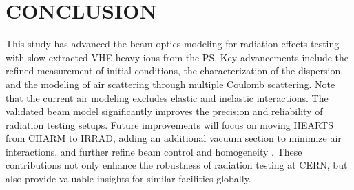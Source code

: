 \documentclass[a4paper,
               biblatex,     %
               ]{jacow}
\begin{document}






\section{CONCLUSION}

This study has advanced the beam optics modeling for radiation effects testing with slow-extracted VHE heavy ions from the PS. Key advancements include the refined measurement of initial conditions, the characterization of the dispersion, and the modeling of air scattering through multiple Coulomb scattering. Note that the current air modeling excludes elastic and inelastic interactions. The validated beam model significantly improves the precision and reliability of radiation testing setups. Future improvements will focus on moving HEARTS from CHARM to IRRAD, adding an additional vacuum section to minimize air interactions, and further refine beam control and homogeneity \cite{scarpa:ipac24-thpr27}. These contributions not only enhance the robustness of radiation testing at CERN, but also provide valuable insights for similar facilities globally.


%
{\printbibliography}
\end{document}

